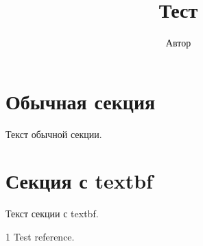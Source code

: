 \documentclass{article}
\title{Тест}
\author{Автор}
\begin{document}
\maketitle

\section{Обычная секция}
Текст обычной секции.

\section{\textbf{Секция с textbf}}
Текст секции с textbf.

\begin{thebibliography}{1}
Test reference.
\end{thebibliography}
\end{document}
